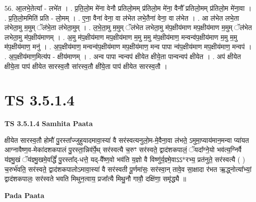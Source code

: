 \documentclass[17pt]{extarticle}
\begin{document}
56. आ॒लभे॒तेत्या᳚ - लभे॑त । . प्र॒ति॒लो॒म मे॑ना वेनौ प्रतिलो॒मम् प्र॑तिलो॒म मे॑ना॒ वैनौ᳚ प्रतिलो॒मम् प्र॑तिलो॒म मे॑ना॒वा । . प्र॒ति॒लो॒ममिति॑ प्रति - लो॒मम् । . ए॒ना॒ वैना॑ वेना॒ वा ल॑भेत लभे॒तैना॑ वेना॒ वा ल॑भेत । . आ ल॑भेत लभे॒ता ल॑भेता॒मु म॒मुम् ॅल॑भे॒ता ल॑भेता॒मुम् । . ल॒भे॒ता॒मु म॒मुम् ॅल॑भेत लभेता॒मु म॑प॒क्षीय॑माण मप॒क्षीय॑माण म॒मुम् ॅल॑भेत 
लभेता॒मु म॑प॒क्षीय॑माणम् । . अ॒मु म॑प॒क्षीय॑माण मप॒क्षीय॑माण म॒मु म॒मु म॑प॒क्षीय॑माण॒ मन्वन्व॑प॒क्षीय॑माण म॒मु म॒मु म॑प॒क्षीय॑माण॒ मनु॑ । . अ॒प॒क्षीय॑माण॒ मन्वन्व॑प॒क्षीय॑माण मप॒क्षीय॑माण॒ मन्व पापा न्व॑प॒क्षीय॑माण मप॒क्षीय॑माण॒ मन्वप॑ । . अ॒प॒क्षीय॑माण॒मित्य॑प - क्षीय॑माणम् । . अन्व पापा न्वन्वप॑ क्षीयेत क्षीये॒ता पान्वन्वप॑ क्षीयेत । . अप॑ क्षीयेत क्षीये॒ता पाप॑ क्षीयेत सारस्व॒तौ सा॑रस्व॒तौ क्षी॑ये॒ता पाप॑ क्षीयेत सारस्व॒तौ । \newline
\pagebreak
{}

\section{ TS 3.5.1.4 }

\textbf{TS 3.5.1.4 } \newline
\textbf{Samhita Paata} \newline

क्षीयेत सारस्व॒तौ होमौ॑ पु॒रस्ता᳚ज्जुहुयादमावा॒स्या॑ वै सर॑स्वत्यनुलो॒म-मे॒वैना॒वा ल॑भते॒ ऽमुमा॒प्याय॑मान॒मन्वा प्या॑यत आग्नावैष्ण॒व-मेका॑दशकपालं पु॒रस्ता॒न्निव॑र्पे॒थ् सर॑स्वत्यै च॒रुꣳ सर॑स्वते॒ द्वाद॑शकपालं॒ ॅयदा᳚ग्ने॒यो भव॑त्य॒ग्निर्वै य॑ज्ञ्मु॒खं ॅय॑ज्ञ्मु॒खमे॒वर्द्धिं॑ पु॒रस्ता᳚द्-धत्ते॒ यद्-वै᳚ष्ण॒वो भव॑ति य॒ज्ञो वै विष्णु॑र्य॒ज्ञ्मे॒वाऽऽ*रभ्य॒ प्रत॑नुते॒ सर॑स्वत्यै ( ) च॒रुर्भ॑वति॒ सर॑स्वते॒ द्वाद॑शकपालोऽमावा॒स्या॑ वै सर॑स्वती पू॒र्णमा॑सः॒ सर॑स्वा॒न् तावे॒व सा॒क्षादा र॑भत ऋ॒द्ध्नोत्या᳚भ्यां॒ द्वाद॑शकपालः॒ सर॑स्वते भवति मिथुन॒त्वाय॒ प्रजा᳚त्यै मिथु॒नौ गावौ॒ दक्षि॑णा॒ समृ॑द्ध्यै ॥ \newline

\textbf{Pada Paata} \newline
\end{document}
